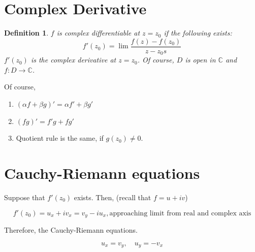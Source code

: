 \documentclass{article}
\newtheorem{definition}[theorem]{Definition}
\newtheorem{one minute paper}[theorem]{One Minute Paper}
\begin{document}
\section*{Complex Derivative}

\begin{definition}
    $f$ is complex differentiable at $z = z_0$ if the following exists:
    \begin{equation}
        f'(z_0) = \lim \frac{f(z) - f(z_0)}{z - z_0s}
    \end{equation}
    $f'(z_0)$ is the complex derivative at $z=z_0$. Of course, $D$ is open in $\mathbb{C}$ and $f: D \rightarrow \mathbb{C}$.  
\end{definition}

Of course, 

\begin{enumerate}
    \item $(\alpha f + \beta g)' = \alpha f' + \beta g'$
    \item $(fg)' = f'g + fg'$
    \item Quotient rule is the same, if $g(z_0) \neq 0$.
\end{enumerate}

\section*{Cauchy-Riemann equations}

Suppose that $f'(z_0)$ exists. Then, (recall that $f = u + iv$) 

\begin{equation}
    f'(z_0) = u_x + i v_x = v_y - iu_x, \text{approaching limit from real and complex axis}
\end{equation}

Therefore, the Cauchy-Riemann equations. 

\begin{equation}
    u_x = v_y, \quad u_y = -v_x
\end{equation}
\end{document}
